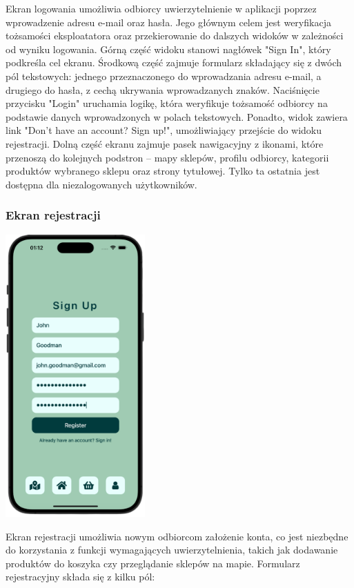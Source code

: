 Ekran logowania umożliwia odbiorcy uwierzytelnienie w aplikacji poprzez wprowadzenie adresu e-mail oraz hasła. Jego głównym celem jest weryfikacja tożsamości eksploatatora oraz przekierowanie do dalszych widoków w zależności od wyniku logowania. Górną część widoku stanowi nagłówek "Sign In", który podkreśla cel ekranu. Środkową część zajmuje formularz składający się z dwóch pól tekstowych: jednego przeznaczonego do wprowadzania adresu e-mail, a drugiego do hasła, z cechą ukrywania wprowadzanych znaków. Naciśnięcie przycisku "Login" uruchamia logikę, która weryfikuje tożsamość odbiorcy na podstawie danych wprowadzonych w polach tekstowych. Ponadto, widok zawiera link "Don't have an account? Sign up!", umożliwiający przejście do widoku rejestracji. Dolną część ekranu zajmuje pasek nawigacyjny z ikonami, które przenoszą do kolejnych podstron – mapy sklepów, profilu odbiorcy, kategorii produktów wybranego sklepu oraz strony tytułowej. Tylko ta ostatnia jest dostępna dla niezalogowanych użytkowników.

\subsubsection{Ekran rejestracji}

\begin{center} \includegraphics[width=0.4\textwidth]{images/front/register_page.png} \end{center}

Ekran rejestracji umożliwia nowym odbiorcom założenie konta, co jest niezbędne do korzystania z funkcji wymagających uwierzytelnienia, takich jak dodawanie produktów do koszyka czy przeglądanie sklepów na mapie. Formularz rejestracyjny składa się z kilku pól:

